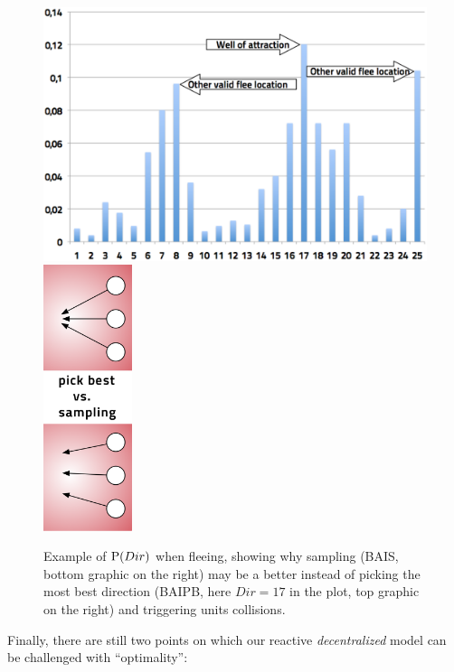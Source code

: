 \begin{figure}[h]
\includegraphics[width=12cm]{images/distDir.png}
\hspace{0.8cm}
\includegraphics[width=2.6cm]{images/flee_sample.png}
\caption{Example of $\mathrm{P}(Dir)$ when fleeing, showing why sampling (BAIS, bottom graphic on the right) may be a better instead of picking the most best direction (BAIPB, here $Dir=17$ in the plot, top graphic on the right) and triggering units collisions.}
\label{fig:BayesianUnitChoice}
\end{figure}
\label{BayesianUnitCCL}
Finally, there are still two points on which our reactive \textit{decentralized} model can be challenged with ``optimality'':

